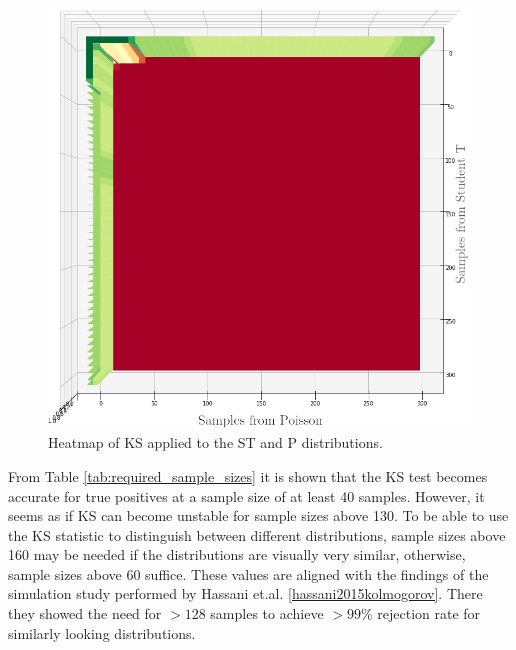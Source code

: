 \begin{figure}[h]
    \centering
    \includegraphics[width=\linewidth]{./img/hypothesis_test/deepar_heatmap_Y_student_t_X_poisson_ks_edited.png}
    \endminipage
    \caption{Heatmap of KS applied to the ST and P distributions.}
    \label{ks_student_t_poisson}
\end{figure}
\clearpage

From Table \ref{tab:required_sample_sizes} it is shown that the KS test becomes accurate for true positives at a sample size of at least 40 samples. However, it seems as if KS can become unstable for sample sizes above 130. To be able to use the KS statistic to distinguish between different distributions, sample sizes above 160 may be needed if the distributions are visually very similar, otherwise, sample sizes above \(60\) suffice. These values are aligned with the findings of the simulation study performed by Hassani et.al. \ref{hassani2015kolmogorov}. There they showed the need for \(>128\) samples to achieve \(>99\)\% rejection rate for similarly looking distributions.

